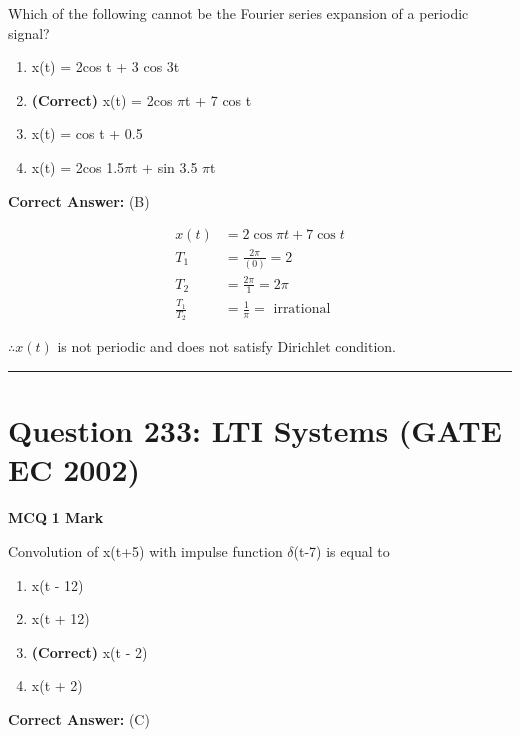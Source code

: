 \documentclass[11pt,a4paper]{article}
\begin{document}
\noindent Which of the following cannot be the Fourier series expansion of a periodic
signal?


\begin{enumerate}[label=(\Alph*)]
    \item x(t) = 2cos t + 3 cos 3t
    \item \textbf{(Correct)} x(t) = 2cos $\pi$t + 7 cos t
    \item x(t) = cos t + 0.5
    \item x(t) = 2cos 1.5$\pi$t + sin 3.5 $\pi$t
\end{enumerate}

\noindent \textbf{Correct Answer:} (B)

\begin{tcolorbox}[solbox, title=Detailed Solution -- Question 232]
\[
\begin{aligned} x(t) &=2 \cos \pi t+7 \cos t \\ T_{1} &=\frac{2 \pi}{(0)}=2 \\ T_{2} &=\frac{2 \pi}{1}=2 \pi \\ \frac{T_{1}}{T_{2}} &=\frac{1}{\pi}=\text { irrational } \end{aligned}
\]

$\therefore x(t)$ is not periodic and does not satisfy Dirichlet condition.
\end{tcolorbox}

\vspace{1.5em}
\hrule
\vspace{1.5em}

\section*{Question 233: LTI Systems (GATE EC 2002)}
\noindent \textbf{\color{primary}MCQ} \hfill \textbf{\color{secondary}1 Mark}


\noindent Convolution of x(t+5) with impulse function $\delta$(t-7) is equal to


\begin{enumerate}[label=(\Alph*)]
    \item x(t - 12)
    \item x(t + 12)
    \item \textbf{(Correct)} x(t - 2)
    \item x(t + 2)
\end{enumerate}

\noindent \textbf{Correct Answer:} (C)
\end{document}
